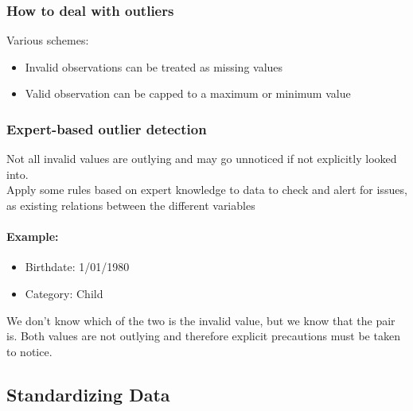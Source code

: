         \subsubsection{How to deal with outliers}
            Various schemes:
            \begin{itemize}
                \item Invalid observations can be treated as missing values 
                \item Valid observation can be capped to a maximum or minimum value
            \end{itemize}
        \subsubsection{Expert-based outlier detection}
            Not all invalid values are outlying and may go unnoticed if not explicitly looked into.\\
            Apply some rules based on expert knowledge to data to check and alert for issues, as existing relations between the different variables
            \paragraph*{Example:}
                \begin{itemize}
                    \item Birthdate: 1/01/1980
                    \item Category: Child
                \end{itemize}
                We don't know which of the two is the invalid value, but we know that the pair is. Both values are not outlying and therefore explicit precautions must be taken to notice.
    \subsection{Standardizing Data}
